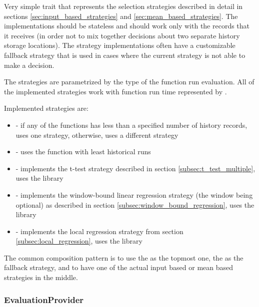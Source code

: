Very simple trait that represents the selection strategies described in detail in sections \ref{sec:input_based_strategies} and \ref{sec:mean_based_strategies}. The implementations should be stateless and should work only with the  records that it receives (in order not to mix together decisions about two separate history storage locations). The strategy implementations often have a customizable fallback strategy that is used in cases where the current strategy is not able to make a decision.

The strategies are parametrized by the  type of the function run evaluation. All of the implemented strategies work with function run time represented by .

Implemented strategies are:
\begin{itemize}
	\item {} - if any of the functions has less than a specified number of history records, uses one strategy, otherwise, uses a different strategy
	\item {} - uses the function with least historical runs
	\item {} - implements the t-test strategy described in section \ref{subsec:t_test_multiple}, uses the  library
	\item {} - implements the window-bound linear regression strategy (the window being optional) as described in section \ref{subsec:window_bound_regression}, uses the  library
	\item {} - implements the local regression strategy from section \ref{subsec:local_regression}, uses the  library
\end{itemize}

The common composition pattern is to use the  as the topmost one, the  as the fallback strategy, and to have one of the actual input based or mean based strategies in the middle.

\subsubsection{EvaluationProvider}

